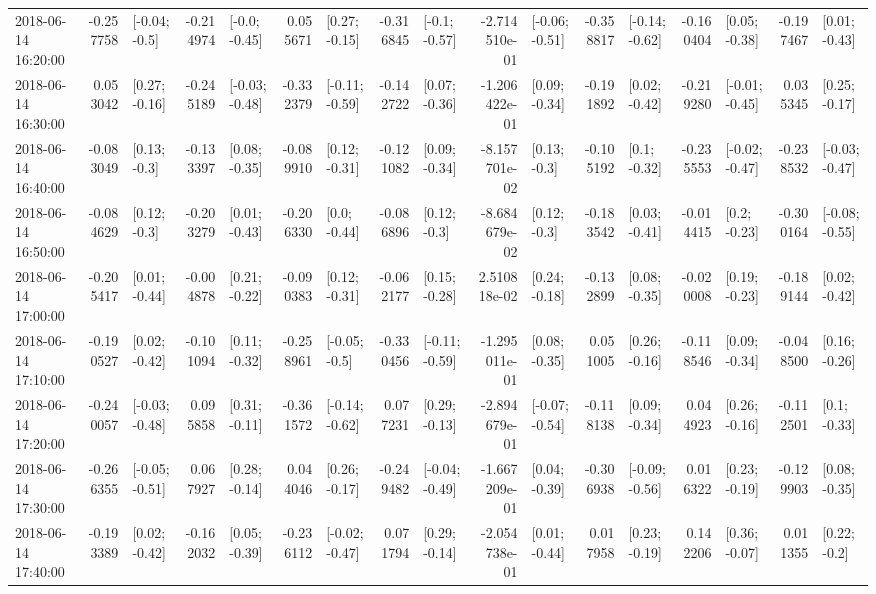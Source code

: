 \begin{tabular}{lrlrlrlrlrlrlrlrl}
2018-06-14 16:20:00 & -0.257758 &   [-0.04; -0.5] & -0.214974 &   [-0.0; -0.45] &  0.055671 &   [0.27; -0.15] & -0.316845 &   [-0.1; -0.57] & -2.714510e-01 &  [-0.06; -0.51] & -0.358817 &  [-0.14; -0.62] & -0.160404 &   [0.05; -0.38] & -0.197467 &   [0.01; -0.43] \\
2018-06-14 16:30:00 &  0.053042 &   [0.27; -0.16] & -0.245189 &  [-0.03; -0.48] & -0.332379 &  [-0.11; -0.59] & -0.142722 &   [0.07; -0.36] & -1.206422e-01 &   [0.09; -0.34] & -0.191892 &   [0.02; -0.42] & -0.219280 &  [-0.01; -0.45] &  0.035345 &   [0.25; -0.17] \\
2018-06-14 16:40:00 & -0.083049 &    [0.13; -0.3] & -0.133397 &   [0.08; -0.35] & -0.089910 &   [0.12; -0.31] & -0.121082 &   [0.09; -0.34] & -8.157701e-02 &    [0.13; -0.3] & -0.105192 &    [0.1; -0.32] & -0.235553 &  [-0.02; -0.47] & -0.238532 &  [-0.03; -0.47] \\
2018-06-14 16:50:00 & -0.084629 &    [0.12; -0.3] & -0.203279 &   [0.01; -0.43] & -0.206330 &    [0.0; -0.44] & -0.086896 &    [0.12; -0.3] & -8.684679e-02 &    [0.12; -0.3] & -0.183542 &   [0.03; -0.41] & -0.014415 &    [0.2; -0.23] & -0.300164 &  [-0.08; -0.55] \\
2018-06-14 17:00:00 & -0.205417 &   [0.01; -0.44] & -0.004878 &   [0.21; -0.22] & -0.090383 &   [0.12; -0.31] & -0.062177 &   [0.15; -0.28] &  2.510818e-02 &   [0.24; -0.18] & -0.132899 &   [0.08; -0.35] & -0.020008 &   [0.19; -0.23] & -0.189144 &   [0.02; -0.42] \\
2018-06-14 17:10:00 & -0.190527 &   [0.02; -0.42] & -0.101094 &   [0.11; -0.32] & -0.258961 &   [-0.05; -0.5] & -0.330456 &  [-0.11; -0.59] & -1.295011e-01 &   [0.08; -0.35] &  0.051005 &   [0.26; -0.16] & -0.118546 &   [0.09; -0.34] & -0.048500 &   [0.16; -0.26] \\
2018-06-14 17:20:00 & -0.240057 &  [-0.03; -0.48] &  0.095858 &   [0.31; -0.11] & -0.361572 &  [-0.14; -0.62] &  0.077231 &   [0.29; -0.13] & -2.894679e-01 &  [-0.07; -0.54] & -0.118138 &   [0.09; -0.34] &  0.044923 &   [0.26; -0.16] & -0.112501 &    [0.1; -0.33] \\
2018-06-14 17:30:00 & -0.266355 &  [-0.05; -0.51] &  0.067927 &   [0.28; -0.14] &  0.044046 &   [0.26; -0.17] & -0.249482 &  [-0.04; -0.49] & -1.667209e-01 &   [0.04; -0.39] & -0.306938 &  [-0.09; -0.56] &  0.016322 &   [0.23; -0.19] & -0.129903 &   [0.08; -0.35] \\
2018-06-14 17:40:00 & -0.193389 &   [0.02; -0.42] & -0.162032 &   [0.05; -0.39] & -0.236112 &  [-0.02; -0.47] &  0.071794 &   [0.29; -0.14] & -2.054738e-01 &   [0.01; -0.44] &  0.017958 &   [0.23; -0.19] &  0.142206 &   [0.36; -0.07] &  0.011355 &    [0.22; -0.2] \\

\end{tabular}
